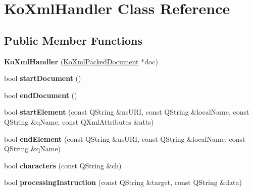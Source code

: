 \hypertarget{classKoXmlHandler}{
\section{KoXmlHandler Class Reference}
\label{classKoXmlHandler}
}
\subsection*{Public Member Functions}
\begin{DoxyCompactItemize}
\item 
\hypertarget{classKoXmlHandler_ac5c9fed09480dd5c11efe7222590d3c2}{
{\bfseries KoXmlHandler} (\hyperlink{classKoXmlPackedDocument}{KoXmlPackedDocument} $\ast$doc)}
\label{classKoXmlHandler_ac5c9fed09480dd5c11efe7222590d3c2}

\item 
\hypertarget{classKoXmlHandler_a23c9a54e10bf33ce31c8f86dc9adcab2}{
bool {\bfseries startDocument} ()}
\label{classKoXmlHandler_a23c9a54e10bf33ce31c8f86dc9adcab2}

\item 
\hypertarget{classKoXmlHandler_a9d69e35da0389a8a240634fbea3ef57d}{
bool {\bfseries endDocument} ()}
\label{classKoXmlHandler_a9d69e35da0389a8a240634fbea3ef57d}

\item 
\hypertarget{classKoXmlHandler_a9889f1c60642d0f218ded29b0a1c065c}{
bool {\bfseries startElement} (const QString \&nsURI, const QString \&localName, const QString \&qName, const QXmlAttributes \&atts)}
\label{classKoXmlHandler_a9889f1c60642d0f218ded29b0a1c065c}

\item 
\hypertarget{classKoXmlHandler_a7e02679ec7d173e01c3fdb146739ab1c}{
bool {\bfseries endElement} (const QString \&nsURI, const QString \&localName, const QString \&qName)}
\label{classKoXmlHandler_a7e02679ec7d173e01c3fdb146739ab1c}

\item 
\hypertarget{classKoXmlHandler_a631ee2738b91ecf640b5a7dda5dea243}{
bool {\bfseries characters} (const QString \&ch)}
\label{classKoXmlHandler_a631ee2738b91ecf640b5a7dda5dea243}

\item 
\hypertarget{classKoXmlHandler_a1f6eff9fca3ff6b755178a6375569b13}{
bool {\bfseries processingInstruction} (const QString \&target, const QString \&data)}
\label{classKoXmlHandler_a1f6eff9fca3ff6b755178a6375569b13}


\end{DoxyCompactItemize}
